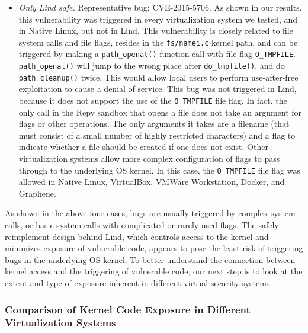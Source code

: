 {\begin{itemize}
\item \emph{Only Lind safe.}  Representative bug: CVE-2015-5706. As
shown in our results, this vulnerability was triggered in every
virtualization system we tested, and in Native Linux, but not in Lind. This vulnerability
is closely related to file system calls and file flags, resides in the \texttt{fs/namei.c}
kernel path, and can be triggered by making a \texttt{path\_openat()} function
call with file flag \texttt{O\_TMPFILE}. \texttt{path\_openat()} will jump to the wrong
place after \texttt{do\_tmpfile()}, and do \texttt{path\_cleanup()} twice. This would
allow local users to perform use-after-free exploitation to cause a denial of service.
This bug was not triggered in Lind, because it does not support the use of the
\texttt{O\_TMPFILE} file flag. In fact, the only call in the Repy sandbox that
opens a file does not take an argument for flags or other operations.  The
only arguments it takes are a filename (that must consist of a small number
of highly restricted characters) and a flag to indicate whether a file should
be created if one does not exist.
Other virtualization systems allow more complex configuration of flags to
pass through to the underlying OS kernel.
In this case, the \texttt{O\_TMPFILE} file flag was
allowed in Native Linux, VirtualBox, VMWare Workstation, Docker, and Graphene.

\end{itemize}

As shown in the above four cases, bugs are usually triggered by
complex system calls,
or basic system calls with complicated or rarely used flags.
The safely-reimplement design behind Lind, which controls access to the kernel and
minimizes exposure of vulnerable code, appears to pose
the least risk of triggering bugs in the underlying OS kernel. To better understand
the connection between kernel access and the triggering of vulnerable code, our
next step is to look at the extent and type of exposure inherent in different
virtual security systems.

\subsubsection{Comparison of Kernel Code Exposure in Different Virtualization
Systems}
\label{Reachable-Kernel-Trace-Analysis-for-Different-Virtualization-Systems}

}

